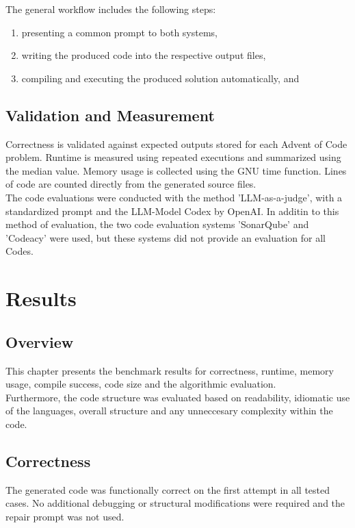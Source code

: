\documentclass[12pt,a4paper]{report}
\begin{document}
The general workflow includes the following steps:
\begin{enumerate}
    \item presenting a common prompt to both systems,
    \item writing the produced code into the respective output files,
    \item compiling and executing the produced solution automatically, and
   
\end{enumerate}



\section{Validation and Measurement}
Correctness is validated against expected outputs stored for each Advent of Code problem. Runtime is measured using repeated executions and summarized using the median value. Memory usage is collected using the GNU time function. Lines of code are counted directly from the generated source files.\\
The code evaluations were conducted with the method 'LLM-as-a-judge', with a standardized prompt and the LLM-Model Codex by OpenAI. In additin to this method of evaluation, the two code evaluation systems 'SonarQube' and 'Codeacy' were used, but these systems did not provide an evaluation for all Codes.





\chapter{Results}

\section{Overview}
This chapter presents the benchmark results for correctness, runtime, memory usage, compile success, code size and the algorithmic evaluation. \\ 
Furthermore, the code structure was evaluated based on readability, idiomatic use of the languages, overall structure and any unneccesary complexity within the code.

\section{Correctness}
The generated code was functionally correct on the first attempt in all tested cases. No additional debugging or structural modifications were required and the repair prompt was not used.
\end{document}
